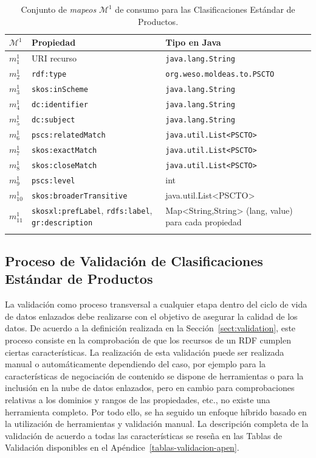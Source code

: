 \begin{longtable}[c]{|p{2cm}|p{6cm}|p{6cm}|} 
\hline
  \textbf{$\mathcal{M}^1$} &  \textbf{Propiedad} & \textbf{Tipo en Java} \\\hline
\endhead
 $m^1_1$ & URI recurso     		& \texttt{java.lang.String} \\ \hline
 $m^1_2$ & \texttt{rdf:type}      	& \texttt{org.weso.moldeas.to.PSCTO} \\ \hline
 $m^1_3$ & \texttt{skos:inScheme} 	& \texttt{java.lang.String}  \\ \hline
 $m^1_4$ & \texttt{dc:identifier} 	& \texttt{java.lang.String} \\ \hline
 $m^1_5$ & \texttt{dc:subject}    	& \texttt{java.lang.String} \\ \hline
 $m^1_6$ & \texttt{pscs:relatedMatch} 	& \texttt{java.util.List<PSCTO> } \\ \hline
 $m^1_7$ & \texttt{skos:exactMatch } 	& \texttt{java.util.List<PSCTO> }\\ \hline
 $m^1_8$ & \texttt{skos:closeMatch } 	& \texttt{java.util.List<PSCTO>}  \\ \hline
 $m^1_9$ & \texttt{pscs:level} 	& int \\ \hline  
 $m^1_{10}$ & \texttt{skos:broaderTransitive} & java.util.List<PSCTO>  \\ \hline
 $m^1_{11}$ & \texttt{skosxl:prefLabel}, \texttt{rdfs:label}, \texttt{gr:description}  & Map<String,String> (lang, value) para cada propiedad \\ \hline   

\hline
\caption{Conjunto de \textit{mapeos} $\mathcal{M}^1$ de consumo para las Clasificaciones Estándar de Productos.}\label{table:pscs-consumo}\\    
\end{longtable}

\subsection{Proceso de Validación de Clasificaciones Estándar de Productos}
La validación como proceso transversal a cualquier etapa dentro del ciclo de vida de datos 
enlazados debe realizarse con el objetivo de asegurar la calidad de los datos. De acuerdo a la 
definición realizada en la Sección~\ref{sect:validation}, este proceso consiste en la comprobación 
de que los recursos de un \dataset RDF cumplen ciertas características. La realización de esta validación 
puede ser realizada manual o automáticamente dependiendo del caso, por ejemplo para la características 
de negociación de contenido se dispone de herramientas o para la inclusión en la nube de datos enlazados, pero 
en cambio para comprobaciones relativas a los dominios y rangos de las propiedades, etc., no existe una 
herramienta completo. Por todo ello, se ha seguido un enfoque híbrido basado en la utilización de herramientas 
y validación manual. La descripción completa de la validación de acuerdo a todas las características 
se reseña en las Tablas de Validación disponibles en el Apéndice~\ref{tablas-validacion-apen}.

